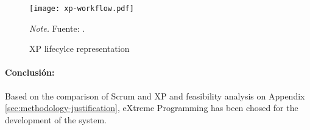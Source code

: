 \begin{figure}
    \centering
    \caption{XP lifecylce representation}\label{fig:xpWorkflowA}
    \texttt{[image: xp-workflow.pdf]}

    \vspace{0.5em}
    \begin{minipage}{\textwidth}
        \small\textit{Note.} Fuente: \textcite{abrahamsson2017agile}.
    \end{minipage}
\end{figure}

\paragraph{Conclusión:} Based on the comparison of Scrum and XP and feasibility analysis on Appendix \ref{sec:methodology-justification}, eXtreme Programming has been chosed for the development of the system.

